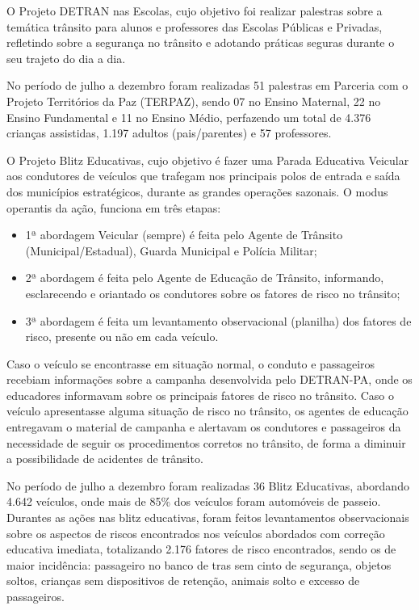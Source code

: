\documentclass[a4paper]{article}
\begin{document}
O Projeto DETRAN nas Escolas, cujo objetivo foi realizar palestras sobre a temática trânsito para alunos e professores das Escolas Públicas e Privadas, refletindo sobre a segurança no trânsito e adotando práticas seguras durante o seu trajeto do dia a dia.\vskip0.3cm

No período de julho a dezembro foram realizadas 51 palestras em Parceria com o Projeto Territórios da Paz (TERPAZ), sendo 07 no Ensino Maternal, 22 no Ensino Fundamental e 11 no Ensino Médio, perfazendo um total de 4.376 crianças assistidas, 1.197 adultos (pais/parentes) e 57 professores.\vskip0.3cm

O Projeto Blitz Educativas, cujo objetivo é fazer uma Parada Educativa Veicular aos condutores de veículos que trafegam nos principais polos de entrada e saída dos municípios estratégicos, durante as grandes operações sazonais. O modus operantis da ação, funciona em três etapas: \vskip0.3cm


\begin{itemize}
\item 1ª abordagem Veicular (sempre) é feita pelo Agente de Trânsito (Municipal/Estadual), Guarda Municipal e Polícia Militar;
\item 2ª abordagem é feita pelo Agente de Educação de Trânsito, informando, esclarecendo e oriantado os condutores sobre os fatores de risco no trânsito;
\item 3ª abordagem é feita um levantamento observacional (planilha) dos fatores de risco, presente ou não em cada veículo.
\end{itemize}

Caso o veículo se encontrasse em situação normal, o conduto e passageiros recebiam informações sobre a campanha desenvolvida pelo DETRAN-PA, onde os educadores informavam sobre os principais fatores de risco no trânsito. Caso o veículo apresentasse alguma situação de risco no trânsito, os agentes de educação entregavam o material de campanha e alertavam os condutores e passageiros da necessidade de seguir os procedimentos corretos no trânsito, de forma a diminuir a possibilidade de acidentes de trânsito.\vskip0.3cm

No período de julho a dezembro foram realizadas 36 Blitz Educativas, abordando 4.642 veículos, onde mais de 85\% dos veículos foram automóveis de passeio. Durantes as ações nas blitz educativas, foram feitos levantamentos observacionais sobre os aspectos de riscos encontrados nos veículos abordados com correção educativa imediata, totalizando 2.176 fatores de risco encontrados, sendo os de maior incidência: passageiro no banco de tras sem cinto de segurança, objetos soltos, crianças sem dispositivos de retenção, animais solto e excesso de passageiros.\vskip0.3cm
\end{document}
